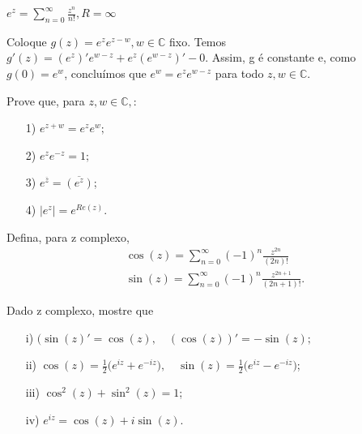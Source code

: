 \documentclass[ComplexAnalysis/complex.tex]{subfiles}
\begin{document}
\begin{example}
	$e^z = \sum_{n=0}^{\infty}\frac{z^n}{n!}, R = \infty$
\end{example}
Coloque $g(z) = e^ze^{z-w}, w\in\mathbb{C}$ fixo. Temos $g'(z) = (e^z)'e^{w-z} + e^z(e^{w-z})' - 0.$
Assim, g é constante e, como $g(0) = e^w$, concluímos que $e^w = e^ze^{w-z}$ para todo
$z, w\in\mathbb{C}$.
\begin{exer*}
	Prove que, para $z, w\in\mathbb{C},$:
	\begin{itemize}
		\item[1)] $e^{z+w} = e^ze^w;$
		\item[2)] $e^ze^{-z} = 1;$
		\item[3)] $e^{\overline{z}} = \overline{(e^z)}$;
		\item[4)] $|e^z| = e^{Re(z)}.$
	\end{itemize}
\end{exer*}
\begin{example}
	Defina, para z complexo,
	\begin{align*}
		 & \cos{(z)} = \sum_{n=0}^{\infty}(-1)^n\frac{z^{2n}}{(2n)!}      \\
		 & \sin{(z)} = \sum_{n=0}^{\infty}(-1)^n\frac{z^{2n+1}}{(2n+1)!}.
	\end{align*}
\end{example}
\begin{exer*}
	Dado z complexo, mostre que
	\begin{itemize}
		\item[i)] $(\sin{(z)}' = \cos{(z)}, \quad (\cos{(z)})' = -\sin{(z)};$
		\item[ii)] $\cos{(z)} = \frac{1}{2}\biggl(e^{iz} + e^{-iz}\biggr), \quad \sin{(z)} = \frac{1}{2}
			      \biggl(e^{iz} - e^{-iz}\biggr)$;
		\item[iii)] $\cos^2{(z)} + \sin^2{(z)} = 1$;
		\item[iv)] $e^{iz} = \cos{(z)} + i\sin{(z)}.$
	\end{itemize}
\end{exer*}
\end{document}
